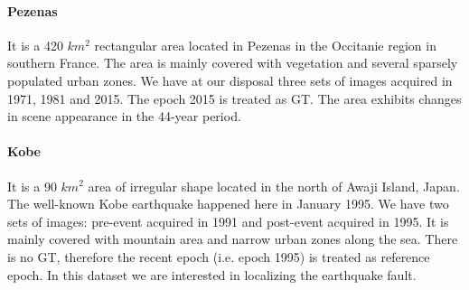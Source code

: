 \paragraph{Pezenas} It is a 420 $km^2$ rectangular area located in Pezenas in the Occitanie region in southern France. The area is mainly covered with vegetation and several sparsely populated urban zones. We have at our disposal three sets of images acquired in 1971, 1981 and 2015. The epoch 2015 is treated as GT. The area exhibits changes in scene appearance in the 44-year period.\\
\paragraph{Kobe} It is a 90 $km^2$ area of irregular shape located in the north of Awaji Island, Japan. The well-known Kobe earthquake happened here in January 1995. We have two sets of images: pre-event acquired in 1991 and post-event acquired in 1995. It is mainly covered with mountain area and narrow urban zones along the sea. There is no GT, therefore the recent epoch (i.e. epoch 1995) is treated as reference epoch. In this dataset we are interested in localizing the earthquake fault.
